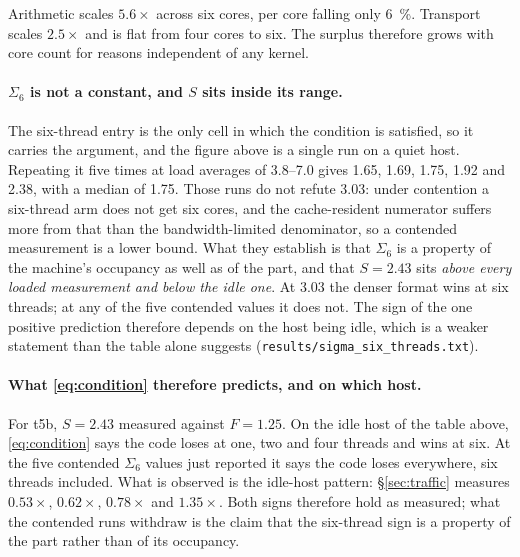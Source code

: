 \documentclass[11pt,a4paper]{article}
\newcommand{\code}[1]{\texttt{#1}}
\begin{document}
Arithmetic scales $5.6\times$ across six cores, per core falling only
\SI{6}{\percent}. Transport scales $2.5\times$ and is flat from four cores to
six. The surplus therefore grows with core count for reasons independent of any
kernel.

\paragraph{$\Sigma_{6}$ is not a constant, and $S$ sits inside its range.}
The six-thread entry is the only cell in which the condition is satisfied, so it
carries the argument, and the figure above is a single run on a quiet host.
Repeating it five times at load averages of \numrange{3.8}{7.0} gives
\num{1.65}, \num{1.69}, \num{1.75}, \num{1.92} and \num{2.38}, with a median of
\num{1.75}. Those runs do not refute \num{3.03}: under contention a
six-thread arm does not get six cores, and the cache-resident numerator suffers
more from that than the bandwidth-limited denominator, so a contended
measurement is a lower bound. What they establish is that $\Sigma_{6}$ is a
property of the machine's occupancy as well as of the part, and that
$S=\num{2.43}$ sits \emph{above every loaded measurement and below the idle
one}. At \num{3.03} the denser format wins at six threads; at any of the five
contended values it does not. The sign of the
one positive prediction therefore depends on the host being idle, which is a
weaker statement than the table alone suggests
(\code{results/sigma\_six\_threads.txt}).

\paragraph{What \eqref{eq:condition} therefore predicts, and on which host.}
For t5b, $S=\num{2.43}$ measured against $F=\num{1.25}$. On the idle host of
the table above, \eqref{eq:condition} says the code loses at one, two and four
threads and wins at six. At the five contended $\Sigma_{6}$ values just
reported it says the code loses everywhere, six threads included. What is
observed is the idle-host pattern: \S\ref{sec:traffic} measures
$\num{0.53}\times$, $\num{0.62}\times$, $\num{0.78}\times$ and
$\num{1.35}\times$. Both signs therefore hold as measured; what the contended
runs withdraw is the claim that the six-thread sign is a property of the part
rather than of its occupancy.
\end{document}
